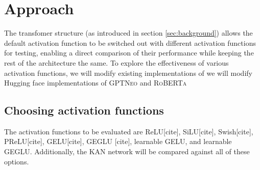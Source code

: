 



\section{Approach} %
\label{sec:approach}
The transfomer structure (as introduced in section \ref{sec:background}) allows the default activation function to be switched out with different activation functions for testing, enabling a direct comparison of their performance while keeping the rest of the architecture the same. To explore the effectiveness of various activation functions, we will modify existing implementations of we will modify Hugging face implementations of \textsc{GPTNeo} \cite{huggingfaceNEO} and \textsc{RoBERTa} \cite{huggingfaceRoberta}

\subsection{Choosing activation functions}
The activation functions to be evaluated are ReLU[cite], SiLU[cite], Swish[cite], PReLU[cite], GELU[cite], GEGLU [cite], learnable GELU, and learnable GEGLU. Additionally, the KAN \cite{Liu2024} network will be compared against all of these options.

